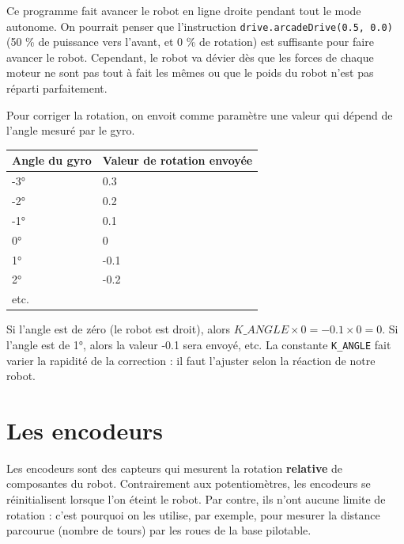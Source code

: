 \documentclass[12pt]{report}
\begin{document}
Ce programme fait avancer le robot en ligne droite pendant tout le mode autonome. On pourrait penser que l'instruction \texttt{drive.arcadeDrive(0.5, 0.0)} (50 \% de puissance vers l'avant, et 0 \% de rotation) est suffisante pour faire avancer le robot. Cependant, le robot va dévier dès que les forces de chaque moteur ne sont pas tout à fait les mêmes ou que le poids du robot n'est pas réparti parfaitement.

Pour corriger la rotation, on envoit comme paramètre une valeur qui dépend de l'angle mesuré par le gyro.

\begin{center}
\begin{tabularx}{0.75\linewidth}{X X}\toprule
\textbf{Angle du gyro} & \textbf{Valeur de rotation envoyée} \\ \midrule
-3° & 0.3 \\
-2° & 0.2 \\
-1° & 0.1 \\
0° & 0 \\
1° & -0.1 \\
2° & -0.2 \\
etc. \\ \bottomrule
\end{tabularx}
\end{center}

Si l'angle est de zéro (le robot est droit), alors $K\_ANGLE \times 0 = -0.1 \times 0 = 0$. Si l'angle est de 1°, alors la valeur -0.1 sera envoyé, etc. La constante \texttt{K\_ANGLE} fait varier la rapidité de la correction : il faut l'ajuster selon la réaction de notre robot.


\section{Les encodeurs}

Les encodeurs sont des capteurs qui mesurent la rotation \textbf{relative} de composantes du robot. Contrairement aux potentiomètres, les encodeurs se réinitialisent lorsque l'on éteint le robot. Par contre, ils n'ont aucune limite de rotation : c'est pourquoi on les utilise, par exemple, pour mesurer la distance parcourue (nombre de tours) par les roues de la base pilotable.
\end{document}
